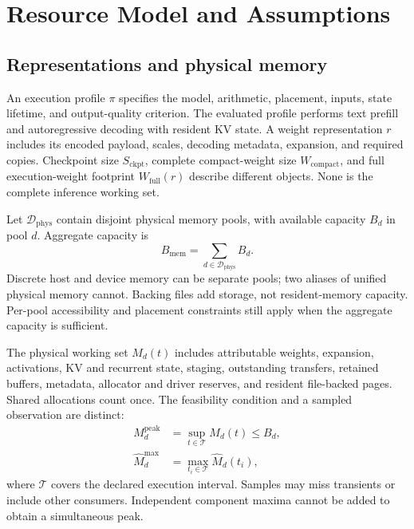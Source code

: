\section{Resource Model and Assumptions}
\label{sec:scope}

\subsection{Representations and physical memory}
An execution profile $\pi$ specifies the model, arithmetic, placement, inputs,
state lifetime, and output-quality criterion. The evaluated profile performs
text prefill and autoregressive decoding with resident KV state. A weight
representation $r$ includes its encoded payload, scales, decoding metadata,
expansion, and required copies. Checkpoint size $S_{\mathrm{ckpt}}$, complete
compact-weight size $W_{\mathrm{compact}}$, and full execution-weight footprint
$W_{\mathrm{full}}(r)$ describe different objects. None is the complete
inference working set.

Let $\mathcal D_{\mathrm{phys}}$ contain disjoint physical memory pools, with
available capacity $B_d$ in pool $d$. Aggregate capacity is
\begin{equation}
 B_{\mathrm{mem}}=\sum_{d\in\mathcal D_{\mathrm{phys}}}B_d.
 \label{eq:physical-capacity}
\end{equation}
Discrete host and device memory can be separate pools; two aliases of unified
physical memory cannot. Backing files add storage, not resident-memory
capacity. Per-pool accessibility and placement constraints still apply when
the aggregate capacity is sufficient.

The physical working set $M_d(t)$ includes attributable weights, expansion,
activations, KV and recurrent state, staging, outstanding transfers, retained
buffers, metadata, allocator and driver reserves, and resident file-backed
pages. Shared allocations count once. The feasibility condition and a sampled
observation are distinct:
\begin{equation}
\begin{aligned}
 M_d^{\mathrm{peak}}&=\sup_{t\in\mathcal T}M_d(t)\leq B_d,\\
 \widehat M_d^{\mathrm{max}}&=\max_{t_i\in\mathcal T}\widehat M_d(t_i),
\end{aligned}
\label{eq:working-set}
\end{equation}
where $\mathcal T$ covers the declared execution interval. Samples may miss
transients or include other consumers. Independent component maxima cannot
be added to obtain a simultaneous peak.

